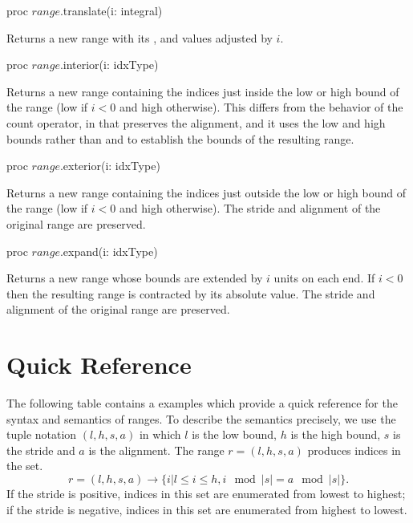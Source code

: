 \begin{protohead}
proc $range$.translate(i: integral)
\end{protohead}
\begin{protobody}
Returns a new range with its ,  and  values
adjusted by $i$.
\end{protobody}

\begin{protohead}
proc $range$.interior(i: idxType)
\end{protohead}
\begin{protobody}
Returns a new range containing the indices just inside the low or high bound of
the range (low if $i < 0$ and high otherwise).
This differs from the behavior of the count operator, in that 
preserves the alignment, and it uses the low and high bounds rather
than  and  to establish the bounds of the resulting range.
\end{protobody}

\begin{protohead}
proc $range$.exterior(i: idxType)
\end{protohead}
\begin{protobody}
Returns a new range containing the indices just outside the low or high bound of
the range (low if $i < 0$ and high otherwise).  The stride and alignment of the
original range are preserved.
\end{protobody}

\begin{protohead}
proc $range$.expand(i: idxType)
\end{protohead}
\begin{protobody}
Returns a new range whose bounds are extended by $i$ units on each end.  If $i <
0$ then the resulting range is contracted by its absolute value.
The stride and alignment of the original range are preserved.
\end{protobody}

\begin{protohead}
\end{protohead}
\begin{protobody}
\end{protobody}

\section{Quick Reference}

The following table contains a examples which provide a quick reference for the
syntax and semantics of ranges.  To describe the semantics precisely, we use the
tuple notation $(l, h, s, a)$ in which $l$ is the low bound, $h$ is the high
bound, $s$ is the stride and $a$ is the alignment.  The range $r = (l, h, s, a)$
produces indices in the set.
\begin{equation}
r = (l, h, s, a) \rightarrow \{i | l \le i \le h, i\!\mod |s| = a\!\mod |s|\}.
\end{equation}
\noindent If the stride is positive, indices in this set are enumerated from lowest to
highest; if the stride is negative, indices in this set are enumerated from
highest to lowest.  

